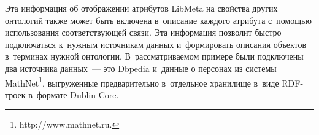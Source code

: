 \begin{multicols}{2}
    
    Эта информация об отображении атрибутов \mbox{LibMeta} на свойства других 
онтологий также может быть включена в~описание каждого атрибута 
с~помощью использования соответствующей связи. Эта информация 
позволит быстро подключаться к~нужным источникам данных 
и~формировать описания объектов в~терминах нужной онтологии.
В~рас\-смат\-ри\-ва\-емом примере были подключены два источника данных~--- 
это Dbpedia и~данные о персонах из системы MathNet\footnote[3]{{\sf  
http://www.mathnet.ru.}}, выгруженные предварительно в~отдельное хранилище 
в~виде RDF-тро\-ек в~формате Dublin Core.



\end{multicols}

\begin{table*}[h]\small
\begin{center}
\vspace*{2ex}


\end{center}
\end{table*}
